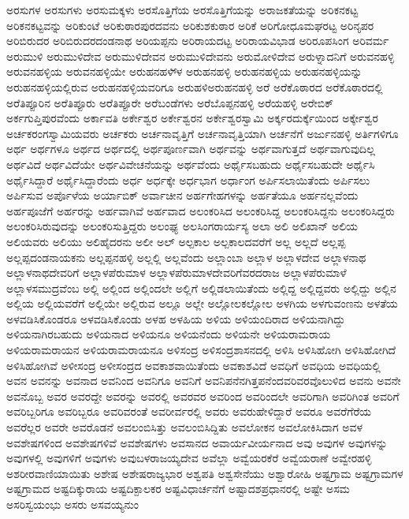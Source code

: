 {ಅರಸುಗಳ
ಅರಸುಗಳು
ಅರಸುಮಕ್ಕಳು
ಅರಸೊತ್ತಿಗೆಯ
ಅರಸೊತ್ತಿಗೆಯನ್ನು
ಅರಾಜಕತೆಯನ್ನು
ಅರಿಕನಕಟ್ಟ
ಅರಿಕನಕಟ್ಟವನ್ನು
ಅರಿಕುಂಟೆ
ಅರಿಕುಠಾರಪುರದವನು
ಅರಿಕುಶಕುಠಾರ
ಅರಿಕೆ
ಅರಿಗೋಧೂಮಘರಟ್ಟ
ಅರಿನೃಪರ
ಅರಿಬಿರುದರ
ಅರಿಬಿರುದರದಂಡನಾಥ
ಅರಿಯಪ್ಪನು
ಅರಿರಾಯದಟ್ಟ
ಅರಿರಾಯವಿಭಾಡ
ಅರಿರೂಪಸಿಂಗ
ಅರಿವರ್ಮ
ಅರುಮುಳಿ
ಅರುಮುಳಿದೇವ
ಅರುಮುಳಿದೇವನ
ಅರುಮುಳಿದೇವನು
ಅರುಮೋಳಿದೇವ
ಅರುಳ್ನಾದನಿಗೆ
ಅರುವನಹಳ್ಳಿ
ಅರುವನಹಳ್ಳಿಯ
ಅರುವನಹಳ್ಳಿಯೇ
ಅರುಹನಹಳಿ್ಳ
ಅರುಹನಹಳ್ಳಿ
ಅರುಹನಹಳ್ಳಿಯ
ಅರುಹನಹಳ್ಳಿಯನ್ನು
ಅರುಹನಹಳ್ಳಿಯಲ್ಲಿರುವ
ಅರುಹನಹಳ್ಳಿಯವರಿಗೂ
ಅರುಹಳಿಅರುಹನಹಳ್ಳಿ
ಅರೆ
ಅರೆಕೊಠಾರದ
ಅರೆಕೊಠಾರದಲ್ಲಿ
ಅರೆತಿಪ್ಪೂರಿನ
ಅರೆತಿಪ್ಪೂರು
ಅರೆತಿಪ್ಪೂರೇ
ಅರೆಬಂಡೆಗಳು
ಅರೆಬೊಪ್ಪನಹಳ್ಳಿ
ಅರೆಯಹಳ್ಳಿ
ಅರೇಬಿಕ್
ಅರ್ಕಗುಪ್ತಿಪುರವೆಂದು
ಅರ್ಕಾವತಿ
ಅರ್ಕೇಶ್ವರ
ಅರ್ಕೇಶ್ವರನ
ಅರ್ಕೇಶ್ವರಸ್ವಾಮಿ
ಅರ್ಕ್ಕರದುರ್ಕ್ಕೆಯಿಂದ
ಅರ್ಕ್ಕೇಶ್ವರ
ಅರ್ಚಕರಂಗಸ್ವಾಮಿಯವರು
ಅರ್ಚಕರು
ಅರ್ಚನಾವೃತ್ತಿಗೆ
ಅರ್ಚನಾವೃತ್ತಿಯಾಗಿ
ಅರ್ಚನೆಗೆ
ಅರ್ಜುನಹಳ್ಳಿ
ಅರ್ತಿಗಳಿಗೂ
ಅರ್ಥ
ಅರ್ಥಗಳೂ
ಅರ್ಥದ
ಅರ್ಥದಲ್ಲಿ
ಅರ್ಥಪೂರ್ಣವಾಗಿ
ಅರ್ಥವನ್ನು
ಅರ್ಥವಾಗುತ್ತದೆ
ಅರ್ಥವಾಗುವುದಿಲ್ಲ
ಅರ್ಥವಿದೆ
ಅರ್ಥವಿದೆಯೇ
ಅರ್ಥವಿವೇಚನೆಯನ್ನು
ಅರ್ಥವೆಂದು
ಅರ್ಥೈಸಬಹುದು
ಅರ್ಥೈಸಬಹುದೇ
ಅರ್ಥೈಸಿ
ಅರ್ಥೈಸಿದ್ದಾರೆ
ಅರ್ಥೈಸಿದ್ದಾರೆಂದು
ಅರ್ಧ
ಅರ್ಧಕ್ಕೇ
ಅರ್ಧಭಾಗ
ಅರ್ಧಾಂಗ
ಅರ್ಪಿಸಲಾಯಿತೆಂದು
ಅರ್ಪಿಸಲು
ಅರ್ಪಿಸುವ
ಅರ್ಪೊಳೆಯ
ಅರ್ಯಾಬಿಕ್
ಅರ್ವಾಚೀನ
ಅರ್ಹಗೇಹಗಳನ್ನು
ಅರ್ಹತೆಯೂ
ಅರ್ಹನಲ್ಲವೆಂದು
ಅರ್ಹಪೂಜೆಗೆ
ಅರ್ಹರನ್ನು
ಅರ್ಹವಾಗಿವೆ
ಅರ್ಹವಾದ
ಅಲಂಕರಿಸಿದ
ಅಲಂಕರಿಸಿದ್ದ
ಅಲಂಕರಿಸಿದ್ದನು
ಅಲಂಕರಿಸಿದ್ದರು
ಅಲಂಕರಿಸಿರುವುದನ್ನು
ಅಲಂಕರಿಸುತ್ತಿದ್ದರು
ಅಲಂಘ್ಯ
ಅಲಸಿಂಗರಾರ್ಯಸ್ಯ
ಅಲಾ
ಅಲಿ
ಅಲಿಖಾನ್
ಅಲಿಯ
ಅಲಿಯವರು
ಅಲಿಯು
ಅಲಿಹೈದರನು
ಅಲೀ
ಅಲ್
ಅಲ್ಪಕಾಲ
ಅಲ್ಪಕಾಲದವರೆಗೆ
ಅಲ್ಲ
ಅಲ್ಲದೆ
ಅಲ್ಲಪ್ಪ
ಅಲ್ಲಪ್ಪದಂಡನಾಯಕನು
ಅಲ್ಲಪ್ಪನಹಳ್ಳಿ
ಅಲ್ಲಲ್ಲಿ
ಅಲ್ಲವೆಂದು
ಅಲ್ಲಾಂಬಾ
ಅಲ್ಲಾಳ
ಅಲ್ಲಾಳದೇವ
ಅಲ್ಲಾಳನಾಥ
ಅಲ್ಲಾಳನಾಥದೇವರಿಗೆ
ಅಲ್ಲಾಳಪೆರುಮಾಳ
ಅಲ್ಲಾಳಪೆರುಮಾಳದೇವರಿಗೆವರದರಾಜ
ಅಲ್ಲಾಳಪೆರುಮಾಳೆ
ಅಲ್ಲಾಳಸಮುದ್ರವೆಂಬ
ಅಲ್ಲಿ
ಅಲ್ಲಿಂದ
ಅಲ್ಲಿಂದಲೇ
ಅಲ್ಲಿಗೆ
ಅಲ್ಲಿಡಲಾಯಿತೆಂದು
ಅಲ್ಲಿದ್ದ
ಅಲ್ಲಿದ್ದವರು
ಅಲ್ಲಿದ್ದು
ಅಲ್ಲಿನ
ಅಲ್ಲಿಯ
ಅಲ್ಲಿಯವರೆಗೆ
ಅಲ್ಲಿಯೇ
ಅಲ್ಲಿರುವ
ಅಲ್ಲೂ
ಅಲ್ಲೇ
ಅಲ್ಲೋಲಕಲ್ಲೋಲ
ಅಳಗಿಯ
ಅಳಗುವಂಣನು
ಅಳತೆಯ
ಅಳವಡಿಸಿಕೊಂಡರೂ
ಅಳವಡಿಸಿಕೊಂಡು
ಅಳಹ
ಅಳಹಿಯ
ಅಳಿಯ
ಅಳಿಯಂದಿರಾದ
ಅಳಿಯನಾಗಿದ್ದು
ಅಳಿಯನಾಗಿರಬಹುದು
ಅಳಿಯನಾದ
ಅಳಿಯನೂ
ಅಳಿಯನೆಂದು
ಅಳಿಯನೇ
ಅಳಿಯರಾಮರಾಯ
ಅಳಿಯರಾಮರಾಯನ
ಅಳಿಯರಾಮರಾಯನೂ
ಅಳಿಸಂದ್ರ
ಅಳಿಸಂದ್ರಶಾಸನದಲ್ಲಿ
ಅಳಿಸಿ
ಅಳಿಸಿಹೋಗಿ
ಅಳಿಸಿಹೋಗಿದೆ
ಅಳಿಸಿಹೋಗಿವೆ
ಅಳೀಸಂದ್ರ
ಅಳೀಸಂದ್ರದ
ಅವಕಾಶವಾಯಿತೆಂದು
ಅವಕಾಶವಿದೆ
ಅವಧಿಗೆ
ಅವಧಿಯ
ಅವಧಿಯಲ್ಲಿ
ಅವನ
ಅವನನ್ನು
ಅವನಾದ
ಅವನಿಂದ
ಅವನಿಗೂ
ಅವನಿಗೆ
ಅವನಿಪನೆನಗಿತ್ತಪನೆಂದವರಿವರವೊಲುಳಿದ
ಅವನು
ಅವನೇ
ಅವನೊಬ್ಬ
ಅವರ
ಅವರದ್ದೇ
ಅವರನ್ನು
ಅವರಲ್ಲಿ
ಅವರವರ
ಅವರಿಂದ
ಅವರಿಂದಲೇ
ಅವರಿಗಾಗಿ
ಅವರಿಗಿಂತ
ಅವರಿಗೆ
ಅವರಿಬ್ಬರಿಗೂ
ಅವರಿಬ್ಬರೂ
ಅವರಿವರಂತೆ
ಅವರೀರ್ವರಲ್ಲಿ
ಅವರು
ಅವರುಹೇಳಿದ್ದಾರೆ
ಅವರೂ
ಅವರೆಗೆರೆಯ
ಅವರೆಲ್ಲರ
ಅವರೇ
ಅವರೊಡನೆ
ಅವಲಂಬಿಸಿತ್ತು
ಅವಲಂಬಿಸಿದ್ದಿತು
ಅವಲೋಕನ
ಅವಲೋಕಿಸಿದಾಗ
ಅವಳ
ಅವಶೇಷಗಳಿಂದ
ಅವಶೇಷಗಳಿವೆ
ಅವಶೇಷಗಳು
ಅವಸಾನದ
ಅವಾರ್ಯವೀರ್ಯನಾದ
ಅವು
ಅವುಗಳ
ಅವುಗಳನ್ನು
ಅವುಗಳಲ್ಲಿ
ಅವುಗಳಿಗೆ
ಅವುಗಳು
ಅವುಬಳರಾಜಯ್ಯದೇವ
ಅವೆಲ್ಲಾ
ಅವ್ವೆಯರಕೆರೆ
ಅವ್ವೆಯರಾಣೆ
ಅವ್ವೇರಹಳ್ಳಿ
ಅಶರೀರವಾಣಿಯಾಯಿತು
ಅಶೇಷ
ಅಶೇಷರಾಜ್ಯಭಾರ
ಅಶ್ವಪತಿ
ಅಶ್ವಸೇನೆಯು
ಅಶ್ವಾರೋಹಿ
ಅಷ್ಟಗ್ರಾಮ
ಅಷ್ಟಗ್ರಾಮಗಳ
ಅಷ್ಟಗ್ರಾಮದ
ಅಷ್ಟದಿಕ್ಕುರಾಯ
ಅಷ್ಟದಿಕ್ಪಾಲಕರ
ಅಷ್ಟವಿಧಾರ್ಚನೆಗೆ
ಅಷ್ಟಾದಶಪ್ರಧಾನರಲ್ಲಿ
ಅಷ್ಟೇ
ಅಸಮ
ಅಸರಿಸ್ವಯಂಭು
ಅಸರು
ಅಸವಯ್ಯನುಂ
}
